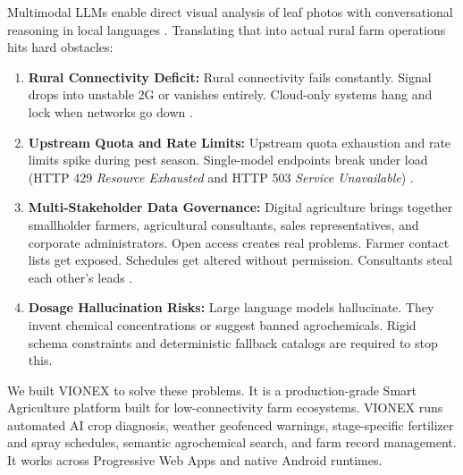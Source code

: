 \documentclass[conference]{IEEEtran}
\begin{document}
Multimodal LLMs enable direct visual analysis of leaf photos with conversational reasoning in local languages \cite{gemini2023}. Translating that into actual rural farm operations hits hard obstacles:
\begin{enumerate}
    \item \textbf{Rural Connectivity Deficit:} Rural connectivity fails constantly. Signal drops into unstable 2G or vanishes entirely. Cloud-only systems hang and lock when networks go down \cite{brewer2005}.
    \item \textbf{Upstream Quota and Rate Limits:} Upstream quota exhaustion and rate limits spike during pest season. Single-model endpoints break under load (HTTP 429 \textit{Resource Exhausted} and HTTP 503 \textit{Service Unavailable}) \cite{verma2024}.
    \item \textbf{Multi-Stakeholder Data Governance:} Digital agriculture brings together smallholder farmers, agricultural consultants, sales representatives, and corporate administrators. Open access creates real problems. Farmer contact lists get exposed. Schedules get altered without permission. Consultants steal each other's leads \cite{maple2017}.
    \item \textbf{Dosage Hallucination Risks:} Large language models hallucinate. They invent chemical concentrations or suggest banned agrochemicals. Rigid schema constraints and deterministic fallback catalogs are required to stop this.
\end{enumerate}

We built VIONEX to solve these problems. It is a production-grade Smart Agriculture platform built for low-connectivity farm ecosystems. VIONEX runs automated AI crop diagnosis, weather geofenced warnings, stage-specific fertilizer and spray schedules, semantic agrochemical search, and farm record management. It works across Progressive Web Apps and native Android runtimes.
\end{document}
